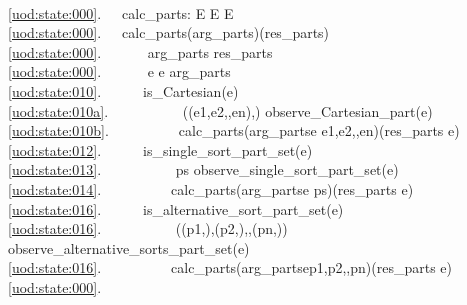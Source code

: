 \bp
{}\\
\ref{uod:state:000}.\ \ \ calc\_parts: E {\RIGHTARROW} E {\RIGHTARROW} E\\
\ref{uod:state:000}.\ \ \ calc\_parts(arg\_parts)(res\_parts) {\IS}\\
\ref{uod:state:000}.\ \ \ \ \ \  arg\_parts {\EQ} {\LBRACE}{\RBRACE}  res\_parts \\
\ref{uod:state:000}.\ \ \ \ \ \  e {\RDOT} e {\ISIN} arg\_parts \\
\ref{uod:state:010}.\ \ \ \ \ \ is\_Cartesian(e) {\RIGHTARROW} \\
\ref{uod:state:010a}.\ \ \ \ \ \ \ \ \ \  ((e1,e2,{\DOTDOTDOT},en),{\UNDERLINE}) {\EQ} observe\_Cartesian\_part(e)  \\
\ref{uod:state:010b}.\ \ \ \ \ \ \ \ \ \ calc\_parts(arg\_parts{\SETMINUS}{\LBRACE}e{\RBRACE} {\UNION} {\LBRACE}e1,e2,{\DOTDOTDOT},en{\RBRACE})(res\_parts {\UNION} {\LBRACE}e{\RBRACE}) \\
\ref{uod:state:012}.\ \ \ \ \ \ is\_single\_sort\_part\_set(e) {\RIGHTARROW}\ \ \ \\
\ref{uod:state:013}.\ \ \ \ \ \ \ \ \ \  ps {\EQ} observe\_single\_sort\_part\_set(e)  \\
\ref{uod:state:014}.\ \ \ \ \ \ \ \ \ \ calc\_parts(arg\_parts{\SETMINUS}{\LBRACE}e{\RBRACE}{\UNION} ps)(res\_parts {\UNION} {\LBRACE}e{\RBRACE}) \\
\ref{uod:state:016}.\ \ \ \ \ \ is\_alternative\_sort\_part\_set(e) {\RIGHTARROW}\ \ \ \ \\
\ref{uod:state:016}.\ \ \ \ \ \ \ \ \ \  ((p1,{\UNDERLINE}),(p2,{\UNDERLINE}),{\DOTDOTDOT},(pn,{\UNDERLINE})) {\EQ} observe\_alternative\_sorts\_part\_set(e)  \\
\ref{uod:state:016}.\ \ \ \ \ \ \ \ \ \ calc\_parts(arg\_parts{\SETMINUS}{\LBRACE}e{\RBRACE}{\UNION}{\LBRACE}p1,p2,{\DOTDOTDOT},pn{\RBRACE})(res\_parts {\UNION} {\LBRACE}e{\RBRACE}) \\
\ref{uod:state:000}.\ \ \ \ \ \  
\ep
\pos{\rm}{}

